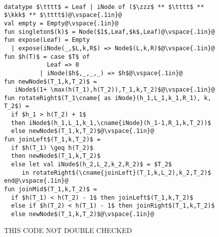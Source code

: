 \begin{figure}
\begin{datastructure}~
\begin{lstlisting}
datatype $\tttt$ = Leaf | iNode of ($\zzz$ ** $\tttt$ ** $\kkk$ ** $\tttt$)@\vspace{.1in}@
val empty = Empty@\vspace{.1in}@
fun singleton$(k)$ = Node($1$,Leaf,$k$,Leaf)@\vspace{.1in}@
fun expose(Leaf) = Empty
  | expose(iNode(_,$L,k,R$) => Node$(L,k,R)$@\vspace{.1in}@
fun $h(T)$ = case $T$ of 
            Leaf => 0
          | iNode($h$,_,_,_) => $h$@\vspace{.1in}@
fun newNode$(T_1,k,T_2)$ =
   iNode$(1+ \max(h(T_1),h(T_2)),T_1,k,T_2)$@\vspace{.1in}@
fun rotateRight$(T_1\cname{ as iNode}(h_1,L_1,k_1,R_1), k, T_2$) =
  if $h_1 > h(T_2) + 1$ 
  then iNode$(h_1,L_1,k_1,\cname{iNode}(h_1-1,R_1,k,T_2))$
  else newNode$(T_1,k,T_2)$@\vspace{.1in}@
fun joinLeft$(T_1,k,T_2)$ =
  if $h(T_1) \geq h(T_2)$ 
  then newNode$(T_1,k,T_2)$
  else let val iNode$(h_2,L_2,k_2,R_2)$ = $T_2$
     in rotateRight$(\cname{joinLeft}(T_1,k,L_2),k_2,T_2)$ end@\vspace{.1in}@
fun joinMid$(T_1,k,T_2)$ =
  if $h(T_1) < h(T_2) - 1$ then joinLeft$(T_1,k,T_2)$
  else if $h(T_2) < h(T_1) - 1$ then joinRight$(T_1,k,T_2)$
  else newNode$(T_1,k,T_2)$@\vspace{.1in}@
\end{lstlisting}
THIS CODE NOT DOUBLE CHECKED
\begin{comment}
Not including the following since it is redundant.
removeMin and join are common among implementations.
joinRight is by symmetry
\begin{lstlisting}
fun rotateLeft$(T_1,k,T_2 \cname{ as Node}(h_2,L_2,k_2,R_2))$ =
  if $h_2 > h(T_1) + 1$ 
  then Node$(h_2,\cname{Node}(h_2-1,T_1,k,L_2),k_2,R_2)$
  else newNode$(T_1,k,T_2)$@\vspace{.1in}@
fun joinRight$(T_1,k,T_2)$ =
  if $h(T_2) \geq h(T_1)$ then newNode$(T_1,k,T_2)$
  else let val Node$(h_1,L_1,k_1,R_1)$ = $T_1$
     in rotateLeft$(L_1,k_1,\cname{joinRight}(R_1,k,T_2))$ end@\vspace{.1in}@
fun removeMin$(T)$ =
  case $T$ of
    Node$(\_,\cname{Leaf},k,\_)$ => $(k,R)$
  | Node$(\_,L,k,R)$ =>
      let val $(m,L')$ = removeMin$(L)$
      in $(m,\cname{rotateLeft}(L',k,R))$ end@\vspace{.1in}@
fun join$(T_1,m,T_2)$ =
  case ($m$,$T_2$) of
    (Some(k),_) => joinMid$(T_1,k,T_2)$
  | (None,Leaf) => $T_1$
  | (None,_) => 
      let val $(k,T_2')$ = removeMin$(T_2)$
      in joinMid$(T_1,k,T_2')$ end
\end{lstlisting}
\end{comment}
\end{datastructure}
\end{figure}

\flushchapter


